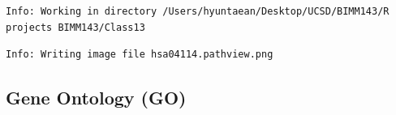 \documentclass[
  letterpaper,
  DIV=11,
  numbers=noendperiod]{scrartcl}
\newenvironment{Shaded}{\begin{snugshade}}{\end{snugshade}}
\newcommand{\AttributeTok}[1]{\textcolor[rgb]{0.40,0.45,0.13}{#1}}
\newcommand{\CommentTok}[1]{\textcolor[rgb]{0.37,0.37,0.37}{#1}}
\newcommand{\FunctionTok}[1]{\textcolor[rgb]{0.28,0.35,0.67}{#1}}
\newcommand{\NormalTok}[1]{\textcolor[rgb]{0.00,0.23,0.31}{#1}}
\newcommand{\OtherTok}[1]{\textcolor[rgb]{0.00,0.23,0.31}{#1}}
\newcommand{\SpecialCharTok}[1]{\textcolor[rgb]{0.37,0.37,0.37}{#1}}
\begin{document}
\begin{verbatim}
Info: Working in directory /Users/hyuntaean/Desktop/UCSD/BIMM143/R projects BIMM143/Class13
\end{verbatim}

\begin{verbatim}
Info: Writing image file hsa04114.pathview.png
\end{verbatim}

\subsection{Gene Ontology (GO)}\label{gene-ontology-go}

\begin{Shaded}
\end{Shaded}
\end{document}
